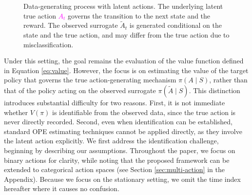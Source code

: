 \documentclass[12pt]{article}
\newcommand{\0}{\boldsymbol{0}}
\begin{document}
\begin{figure}[t]
\centering
{}
\caption{Data-generating process with latent actions. The underlying latent true action \textcolor{magenta}{$A_t$} governs the transition to the next state and the reward. The observed surrogate $\widetilde A_t$ is generated conditional on the state and the true action, and may differ from the true action due to misclassification.}
\label{fig:dgp}
\end{figure}

Under this setting, the goal remains the evaluation of the value function defined in Equation \eqref{eq:value}. However, the focus is on estimating the value of the target policy that governs the true action-generating mechanism $\pi(A\mid S)$, rather than that of the policy acting on the observed surrogate $\pi(\widetilde{A}\mid S)$. This distinction introduces substantial difficulty for two reasons. First, it is not immediate whether $V(\pi)$ is identifiable from the observed data, since the true action is never directly recorded. Second, even when identification can be established, standard OPE estimating techniques cannot be applied directly, as they involve the latent action explicitly. We first address the identification challenge, beginning by describing our assumptions. Throughout the paper, we focus on binary actions for clarity, while noting that the proposed framework can be extended to categorical action spaces (see Section \ref{sec:multi-action} in the Appendix). Because we focus on the stationary setting, we omit the time index hereafter where it causes no confusion.
\end{document}

